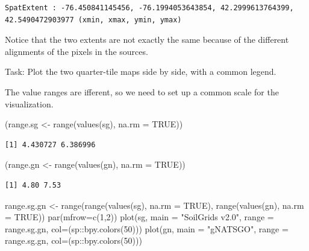 \documentclass[
  letterpaper,
  DIV=11,
  numbers=noendperiod]{scrartcl}
\newenvironment{Shaded}{\begin{snugshade}}{\end{snugshade}}
\newcommand{\AttributeTok}[1]{\textcolor[rgb]{0.40,0.45,0.13}{#1}}
\newcommand{\ConstantTok}[1]{\textcolor[rgb]{0.56,0.35,0.01}{#1}}
\newcommand{\DecValTok}[1]{\textcolor[rgb]{0.68,0.00,0.00}{#1}}
\newcommand{\FunctionTok}[1]{\textcolor[rgb]{0.28,0.35,0.67}{#1}}
\newcommand{\NormalTok}[1]{\textcolor[rgb]{0.00,0.23,0.31}{#1}}
\newcommand{\OtherTok}[1]{\textcolor[rgb]{0.00,0.23,0.31}{#1}}
\newcommand{\SpecialCharTok}[1]{\textcolor[rgb]{0.37,0.37,0.37}{#1}}
\newcommand{\StringTok}[1]{\textcolor[rgb]{0.13,0.47,0.30}{#1}}
\begin{document}
\begin{verbatim}
SpatExtent : -76.450841145456, -76.1994053643854, 42.2999613764399, 42.5490472903977 (xmin, xmax, ymin, ymax)
\end{verbatim}

Notice that the two extents are not exactly the same because of the
different alignments of the pixels in the sources.

Task: Plot the two quarter-tile maps side by side, with a common legend.

The value ranges are ifferent, so we need to set up a common scale for
the visualization.

\begin{Shaded}
\begin{Highlighting}[]
\NormalTok{(range.sg }\OtherTok{\textless{}{-}} \FunctionTok{range}\NormalTok{(}\FunctionTok{values}\NormalTok{(sg), }\AttributeTok{na.rm =} \ConstantTok{TRUE}\NormalTok{))}
\end{Highlighting}
\end{Shaded}

\begin{verbatim}
[1] 4.430727 6.386996
\end{verbatim}

\begin{Shaded}
\begin{Highlighting}[]
\NormalTok{(range.gn }\OtherTok{\textless{}{-}} \FunctionTok{range}\NormalTok{(}\FunctionTok{values}\NormalTok{(gn), }\AttributeTok{na.rm =} \ConstantTok{TRUE}\NormalTok{))}
\end{Highlighting}
\end{Shaded}

\begin{verbatim}
[1] 4.80 7.53
\end{verbatim}

\begin{Shaded}
\begin{Highlighting}[]
\NormalTok{range.sg.gn }\OtherTok{\textless{}{-}} \FunctionTok{range}\NormalTok{(}\FunctionTok{range}\NormalTok{(}\FunctionTok{values}\NormalTok{(sg), }\AttributeTok{na.rm =} \ConstantTok{TRUE}\NormalTok{), }
                     \FunctionTok{range}\NormalTok{(}\FunctionTok{values}\NormalTok{(gn), }\AttributeTok{na.rm =} \ConstantTok{TRUE}\NormalTok{))}
\FunctionTok{par}\NormalTok{(}\AttributeTok{mfrow=}\FunctionTok{c}\NormalTok{(}\DecValTok{1}\NormalTok{,}\DecValTok{2}\NormalTok{))}
\FunctionTok{plot}\NormalTok{(sg, }\AttributeTok{main =} \StringTok{"SoilGrids v2.0"}\NormalTok{, }
     \AttributeTok{range =}\NormalTok{ range.sg.gn, }\AttributeTok{col=}\NormalTok{(sp}\SpecialCharTok{::}\FunctionTok{bpy.colors}\NormalTok{(}\DecValTok{50}\NormalTok{)))}
\FunctionTok{plot}\NormalTok{(gn, }\AttributeTok{main =} \StringTok{"gNATSGO"}\NormalTok{, }
     \AttributeTok{range =}\NormalTok{ range.sg.gn, }\AttributeTok{col=}\NormalTok{(sp}\SpecialCharTok{::}\FunctionTok{bpy.colors}\NormalTok{(}\DecValTok{50}\NormalTok{)))}
\end{Highlighting}
\end{Shaded}
\end{document}
